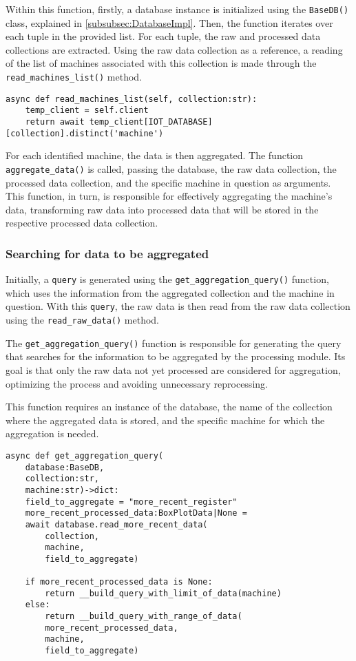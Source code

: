 Within this function, firstly, a database instance is initialized using the \texttt{BaseDB()} class, explained in \ref{subsubsec:DatabaseImpl}. Then, the function iterates over each tuple in the provided list. For each tuple, the raw and processed data collections are extracted. Using the raw data collection as a reference, a reading of the list of machines associated with this collection is made through the \texttt{read\_machines\_list()} method.

\begin{verbatim}
async def read_machines_list(self, collection:str):
    temp_client = self.client
    return await temp_client[IOT_DATABASE][collection].distinct('machine')
\end{verbatim}

For each identified machine, the data is then aggregated. The function \texttt{aggregate\_data()} is called, passing the database, the raw data collection, the processed data collection, and the specific machine in question as arguments. This function, in turn, is responsible for effectively aggregating the machine's data, transforming raw data into processed data that will be stored in the respective processed data collection.

\subsubsection{Searching for data to be aggregated}
Initially, a \texttt{query} is generated using the \texttt{get\_aggregation\_query()} function, which uses the information from the aggregated collection and the machine in question. With this \texttt{query}, the raw data is then read from the raw data collection using the \texttt{read\_raw\_data()} method.

The \texttt{get\_aggregation\_query()} function is responsible for generating the query that searches for the information to be aggregated by the processing module. Its goal is that only the raw data not yet processed are considered for aggregation, optimizing the process and avoiding unnecessary reprocessing.

This function requires an instance of the database, the name of the collection where the aggregated data is stored, and the specific machine for which the aggregation is needed.

\begin{verbatim}
async def get_aggregation_query(
    database:BaseDB,
    collection:str,
    machine:str)->dict:
    field_to_aggregate = "more_recent_register"
    more_recent_processed_data:BoxPlotData|None = 
    await database.read_more_recent_data(
        collection,
        machine,
        field_to_aggregate)
    
    if more_recent_processed_data is None:
        return __build_query_with_limit_of_data(machine) 
    else:
        return __build_query_with_range_of_data(
        more_recent_processed_data,
        machine,
        field_to_aggregate)
\end{verbatim}

